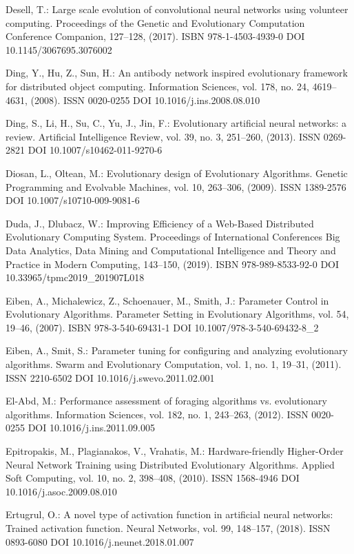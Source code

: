 \begin{thebibliography}{99.}
 Desell, T.: Large scale evolution of convolutional neural networks using volunteer computing. Proceedings of the Genetic and Evolutionary Computation Conference Companion, 127--128, (2017). ISBN 978-1-4503-4939-0 DOI 10.1145/3067695.3076002

 Ding, Y., Hu, Z., Sun, H.: An antibody network inspired evolutionary framework for distributed object computing. Information Sciences, vol. 178, no. 24, 4619--4631, (2008). ISSN 0020-0255 DOI 10.1016/j.ins.2008.08.010

 Ding, S., Li, H., Su, C., Yu, J., Jin, F.: Evolutionary artificial neural networks: a review. Artificial Intelligence Review, vol. 39, no. 3, 251--260, (2013). ISSN 0269-2821 DOI 10.1007/s10462-011-9270-6

 Diosan, L., Oltean, M.: Evolutionary design of Evolutionary Algorithms. Genetic Programming and Evolvable Machines, vol. 10, 263--306, (2009). ISSN 1389-2576 DOI 10.1007/s10710-009-9081-6

 Duda, J., Dlubacz, W.: Improving Efficiency of a Web-Based Distributed Evolutionary Computing System. Proceedings of International Conferences Big Data Analytics, Data Mining and Computational Intelligence and Theory and Practice in Modern Computing, 143--150, (2019). ISBN 978-989-8533-92-0 DOI 10.33965/tpmc2019\_201907L018

 Eiben, A., Michalewicz, Z., Schoenauer, M., Smith, J.: Parameter Control in Evolutionary Algorithms. Parameter Setting in Evolutionary Algorithms, vol. 54, 19--46, (2007). ISBN 978-3-540-69431-1 DOI 10.1007/978-3-540-69432-8\_2

 Eiben, A., Smit, S.: Parameter tuning for configuring and analyzing evolutionary algorithms. Swarm and Evolutionary Computation, vol. 1, no. 1, 19--31, (2011). ISSN 2210-6502 DOI 10.1016/j.swevo.2011.02.001

 El-Abd, M.: Performance assessment of foraging algorithms vs. evolutionary algorithms. Information Sciences, vol. 182, no. 1, 243--263, (2012). ISSN 0020-0255 DOI 10.1016/j.ins.2011.09.005

 Epitropakis, M., Plagianakos, V., Vrahatis, M.: Hardware-friendly Higher-Order Neural Network Training using Distributed Evolutionary Algorithms. Applied Soft Computing, vol. 10, no. 2, 398--408, (2010). ISSN 1568-4946 DOI 10.1016/j.asoc.2009.08.010

 Ertugrul, O.: A novel type of activation function in artificial neural networks: Trained activation function. Neural Networks, vol. 99, 148--157, (2018). ISSN 0893-6080 DOI 10.1016/j.neunet.2018.01.007


\end{thebibliography}
